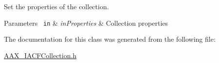 Set the properties of the collection. 


\begin{DoxyParams}[1]{Parameters}
\mbox{\texttt{ in}}  & {\em in\+Properties} & Collection properties \\
\hline
\end{DoxyParams}


The documentation for this class was generated from the following file\+:\begin{DoxyCompactItemize}
\item 
\mbox{\hyperlink{a00509}{A\+A\+X\+\_\+\+I\+A\+C\+F\+Collection.\+h}}\end{DoxyCompactItemize}

